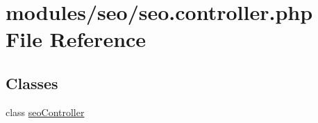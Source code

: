 \hypertarget{seo_8controller_8php}{\section{modules/seo/seo.controller.\-php File Reference}
\label{seo_8controller_8php}
}
\subsection*{Classes}
\begin{DoxyCompactItemize}
\item 
class \hyperlink{classseoController}{seo\-Controller}
\end{DoxyCompactItemize}
